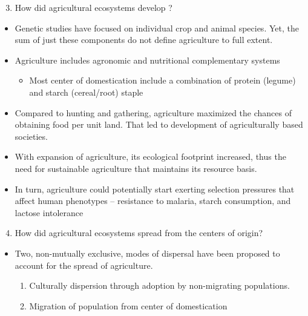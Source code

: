 \documentclass[
  ignorenonframetext,
  aspectratio=169]{beamer}
\providecommand{\tightlist}{%
  \setlength{\itemsep}{0pt}\setlength{\parskip}{0pt}}
\begin{document}
\begin{frame}{}
\protect\hypertarget{section-14}{}
\footnotesize

\begin{enumerate}[<+->]
\setcounter{enumi}{2}
\tightlist
\item
  \alert{How did agricultural ecosystems develop ?}
\end{enumerate}

\begin{itemize}[<+->]
\tightlist
\item
  Genetic studies have focused on individual crop and animal species.
  Yet, the sum of just these components do not define agriculture to
  full extent.
\item
  Agriculture includes agronomic and nutritional complementary systems

  \begin{itemize}[<+->]
  \tightlist
  \item
    Most center of domestication include a combination of protein
    (legume) and starch (cereal/root) staple
  \end{itemize}
\item
  Compared to hunting and gathering, agriculture maximized the chances
  of obtaining food per unit land. That led to development of
  agriculturally based societies.
\item
  With expansion of agriculture, its ecological footprint increased,
  thus the need for sustainable agriculture that maintains its resource
  basis.
\item
  In turn, agriculture could potentially start exerting selection
  pressures that affect human phenotypes -- resistance to malaria,
  starch consumption, and lactose intolerance
\end{itemize}

\begin{enumerate}[<+->]
\setcounter{enumi}{3}
\tightlist
\item
  \alert{How did agricultural ecosystems spread from the centers of origin?}
\end{enumerate}

\begin{itemize}[<+->]
\tightlist
\item
  Two, non-mutually exclusive, modes of dispersal have been proposed to
  account for the spread of agriculture.

  \begin{enumerate}[<+->]
  \tightlist
  \item
    Culturally dispersion through adoption by non-migrating populations.
  \item
    Migration of population from center of domestication
  \end{enumerate}
\end{itemize}
\end{frame}
\end{document}
